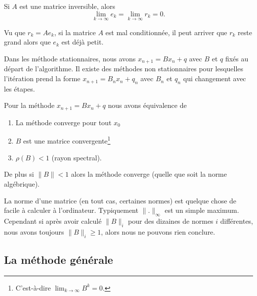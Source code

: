 \begin{proposition}
	Si \( A\) est une matrice inversible, alors
	\begin{equation}
		\lim_{k\to \infty} e_k=\lim_{k\to \infty} r_k=0.
	\end{equation}
\end{proposition}

Vu que \( r_k=Ae_k\), si la matrice \( A\) est mal conditionnée, il peut arriver que \( r_k\) reste grand alors que \( e_k\) est déjà petit.

\begin{remark}
	Dans les méthode stationnaires, nous avons \( x_{n+1}=Bx_n+q\) avec \( B\) et \( q\) fixés au départ de l'algorithme. Il existe des méthodes non stationnaires pour lesquelles l'itération prend la forme \( x_{n+1}=B_nx_n+q_n\) avec \( B_n\) et \( q_n\) qui changement avec les étapes.
\end{remark}

\begin{proposition}     \label{PROPooAQSWooSTXDCO}
	Pour la méthode \( x_{n+1}=Bx_n+q\) nous avons équivalence de
	\begin{enumerate}
		\item
		      La méthode converge pour tout \( x_0\)
		\item
		      \( B\) est une matrice convergente\footnote{C'est-à-dire \( \lim_{k\to \infty} B^k=0\).}
		\item
		      \( \rho(B)<1\) (rayon spectral).
	\end{enumerate}
	De plus si \( \| B \|<1\) alors la méthode converge (quelle que soit la norme algébrique).
\end{proposition}

La norme d'une matrice (en tout cas, certaines normes) est quelque chose de facile à calculer à l'ordinateur. Typiquement \( \| . \|_{\infty}\) est un simple maximum. Cependant si après avoir calculé \( \| B \|_i\) pour des dizaines de normes \( i\) différentes, nous avons toujours \( \| B\|_i\geq 1\), alors nous ne pouvons rien conclure.

\subsection{La méthode générale}

